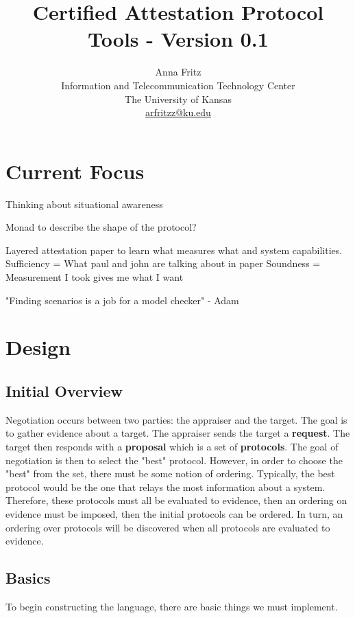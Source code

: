 \documentclass[10pt]{report}
\title{Certified Attestation Protocol Tools - Version 0.1}
\author{
  Anna Fritz \\
  Information and Telecommunication Technology Center \\
  The University of Kansas \\
  \url{arfritzz@ku.edu}
}
\begin{document}
\maketitle
\tableofcontents

\chapter{Current Focus}

Thinking about situational awareness

Monad to describe the shape of the protocol? 

Layered attestation paper to learn what measures what and system 
capabilities. 
Sufficiency =  What paul and john are talking about in paper
Soundness = Measurement  I took gives me what I want

"Finding scenarios is a job for a model checker" - Adam

\chapter{Design}

\section{Initial Overview}

Negotiation occurs between two parties: the appraiser and the target.
The goal is to gather evidence about a target. The appraiser sends the
target a \textbf{request}. The target then responds
with a \textbf{proposal} which is a set of \textbf{protocols}. The goal of
negotiation is then to select the "best" protocol. However, in order to
choose the "best" from the set, there must be some notion of ordering.
Typically, the best protocol would be the one that relays the most 
information about a system. Therefore, these protocols must all be evaluated
to evidence, then an ordering on evidence must be imposed, then the initial protocols can be ordered. 
In turn, an ordering over protocols will be discovered when all 
protocols are evaluated to evidence.  

\section{Basics}

To begin constructing the language, there are basic things we must implement. 
\end{document}

